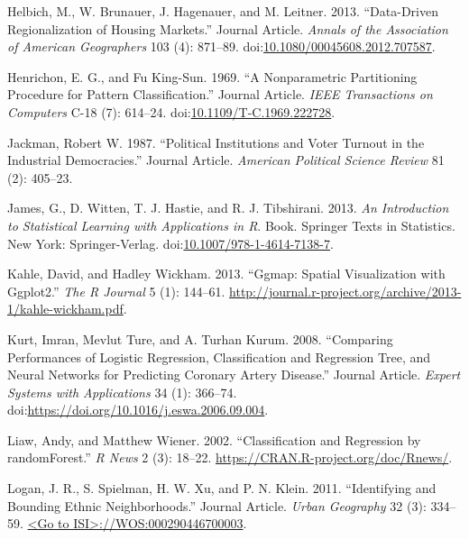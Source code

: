 \documentclass[]{elsarticle} %
\begin{document}
\hypertarget{ref-Helbich2013}{}
Helbich, M., W. Brunauer, J. Hagenauer, and M. Leitner. 2013.
``Data-Driven Regionalization of Housing Markets.'' Journal Article.
\emph{Annals of the Association of American Geographers} 103 (4):
871--89.
doi:\href{https://doi.org/10.1080/00045608.2012.707587}{10.1080/00045608.2012.707587}.

\hypertarget{ref-Henrichon1969}{}
Henrichon, E. G., and Fu King-Sun. 1969. ``A Nonparametric Partitioning
Procedure for Pattern Classification.'' Journal Article. \emph{IEEE
Transactions on Computers} C-18 (7): 614--24.
doi:\href{https://doi.org/10.1109/T-C.1969.222728}{10.1109/T-C.1969.222728}.

\hypertarget{ref-Jackman1987}{}
Jackman, Robert W. 1987. ``Political Institutions and Voter Turnout in
the Industrial Democracies.'' Journal Article. \emph{American Political
Science Review} 81 (2): 405--23.

\hypertarget{ref-James2013}{}
James, G., D. Witten, T. J. Hastie, and R. J. Tibshirani. 2013. \emph{An
Introduction to Statistical Learning with Applications in R}. Book.
Springer Texts in Statistics. New York: Springer-Verlag.
doi:\href{https://doi.org/10.1007/978-1-4614-7138-7}{10.1007/978-1-4614-7138-7}.

\hypertarget{ref-Khale2013}{}
Kahle, David, and Hadley Wickham. 2013. ``Ggmap: Spatial Visualization
with Ggplot2.'' \emph{The R Journal} 5 (1): 144--61.
\url{http://journal.r-project.org/archive/2013-1/kahle-wickham.pdf}.

\hypertarget{ref-Kurt2008}{}
Kurt, Imran, Mevlut Ture, and A. Turhan Kurum. 2008. ``Comparing
Performances of Logistic Regression, Classification and Regression Tree,
and Neural Networks for Predicting Coronary Artery Disease.'' Journal
Article. \emph{Expert Systems with Applications} 34 (1): 366--74.
doi:\href{https://doi.org/https://doi.org/10.1016/j.eswa.2006.09.004}{https://doi.org/10.1016/j.eswa.2006.09.004}.

\hypertarget{ref-Liaw2002}{}
Liaw, Andy, and Matthew Wiener. 2002. ``Classification and Regression by
randomForest.'' \emph{R News} 2 (3): 18--22.
\url{https://CRAN.R-project.org/doc/Rnews/}.

\hypertarget{ref-Logan2011}{}
Logan, J. R., S. Spielman, H. W. Xu, and P. N. Klein. 2011.
``Identifying and Bounding Ethnic Neighborhoods.'' Journal Article.
\emph{Urban Geography} 32 (3): 334--59.
\href{\%3CGo\%20to\%20ISI\%3E://WOS:000290446700003}{\textless{}Go to ISI\textgreater{}://WOS:000290446700003}.
\end{document}
